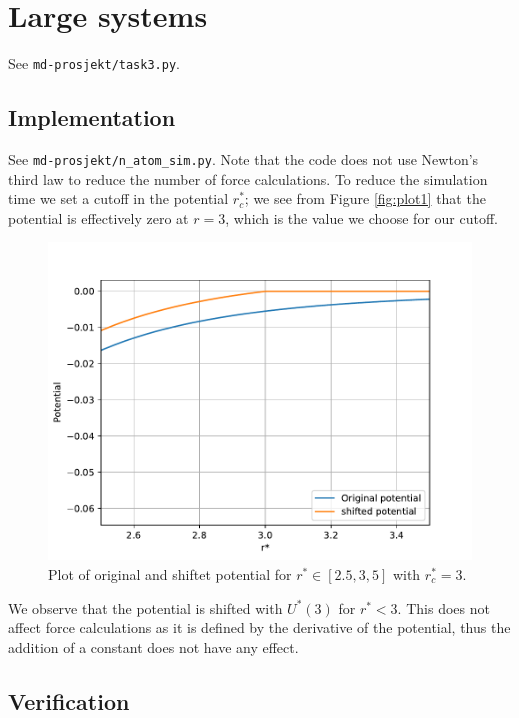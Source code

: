 \documentclass[a4paper,10pt,english]{article}
\begin{document}
\newpage

\section{Large systems} \label{3}

See \verb|md-prosjekt/task3.py|.

\subsection{Implementation} \label{3a}
See \verb|md-prosjekt/n_atom_sim.py|. Note that the code does not use Newton's third law to reduce the number of force calculations. To reduce the simulation time we set a cutoff in the potential $r_c^*$; we see from Figure \ref{fig:plot1} that the potential is effectively zero at $r=3$, which is the value we choose for our cutoff.

\begin{figure} [h!]
    \centering
    \includegraphics[scale=0.65]{../figures/3_a_iv.pdf}
    \caption{Plot of original and shiftet potential for $r^* \in [2.5, 3,5]$ with $r_c^* = 3$.}
    \label{fig:shiftedpotential}
\end{figure}

We observe that the potential is shifted with $U^*(3)$ for $r^*<3$. This does not affect force calculations as it is defined by the derivative of the potential, thus the addition of a constant does not have any effect.

\newpage

\subsection{Verification} \label{3b}
\end{document}
